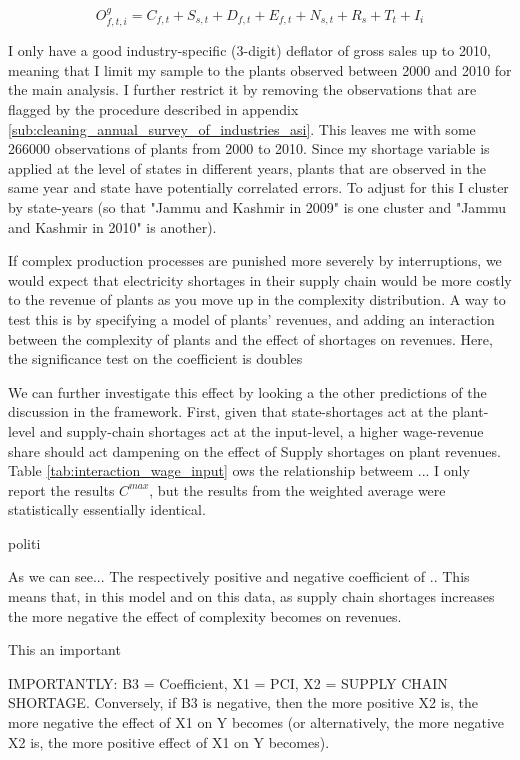 \documentclass[11pt]{article}
\begin{document}
\[
	O^{g}_{f,t,i} = C_{f,t} + S_{s,t} + D_{f,t} + E_{f,t} + N_{s,t} + R_{s} + T_{t} + I_{i}
\]

I only have a good industry-specific (3-digit) deflator of gross sales up to 2010, meaning that I limit my sample to the plants observed between 2000 and 2010 for the main analysis. I further restrict it by removing the observations that are flagged by the procedure described in appendix \ref{sub:cleaning_annual_survey_of_industries_asi}. This leaves me with some 266000 observations of plants from 2000 to 2010. Since my shortage variable is applied at the level of states in different years, plants that are observed in the same year and state have potentially correlated errors. To adjust for this I cluster by state-years (so that "Jammu and Kashmir in 2009" is one cluster and "Jammu and Kashmir in 2010" is another). 




If complex production processes are punished more severely by interruptions, we would expect that electricity shortages in their supply chain would be more costly to the revenue of plants as you move up in the complexity distribution. A way to test this is by specifying a model of plants' revenues, and adding an interaction between the complexity of plants and the effect of shortages on revenues. Here, the significance test on the coefficient is doubles 


We can further investigate this effect by looking a the other predictions of the discussion in the framework. First, given that state-shortages act at the plant-level and supply-chain shortages act at the input-level, a higher wage-revenue share should act dampening on the effect of Supply shortages on plant revenues. Table \ref{tab:interaction_wage_input} ows the relationship betweem ...
I only report the results $C^{max}$, but the results from the weighted average were statistically essentially identical.

politi

As we can see... The respectively positive and negative coefficient of  .. 
This means that, in this model and on this data, as supply chain shortages increases the more negative the effect of complexity becomes on revenues.


This an important

IMPORTANTLY: B3 = Coefficient, X1 = PCI, X2 = SUPPLY CHAIN SHORTAGE.
Conversely, if B3 is negative, then the more positive X2 is, the more negative the effect of X1 on Y becomes (or alternatively, the more negative X2 is, the more positive effect of X1 on Y becomes). 
\end{document}
